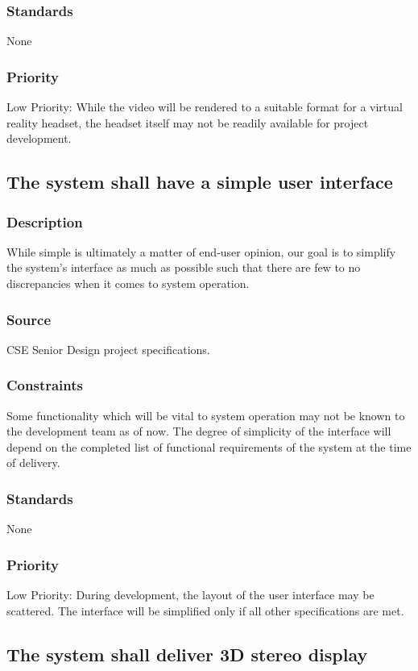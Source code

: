 \subsubsection{Standards}
None
\subsubsection{Priority}
Low Priority: While the video will be rendered to a suitable format for a virtual reality headset, the headset itself may not be readily available for project development.

\subsection{The system shall have a simple user interface}
\subsubsection{Description}
While simple is ultimately a matter of end-user opinion, our goal is to simplify the system's interface as much as possible such that there are few to no discrepancies when it comes to system operation.
\subsubsection{Source}
CSE Senior Design project specifications.
\subsubsection{Constraints}
Some functionality which will be vital to system operation may not be known to the development team as of now. The degree of simplicity of the interface will depend on the completed list of functional requirements of the system at the time of delivery.  
\subsubsection{Standards}
None
\subsubsection{Priority}
Low Priority: During development, the layout of the user interface may be scattered. The interface will be simplified only if all other specifications are met.

\subsection{The system shall deliver 3D stereo display}
